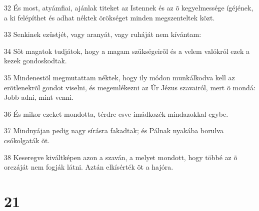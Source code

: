 \par 32 És most, atyámfiai, ajánlak titeket az Istennek és az õ kegyelmessége ígéjének, a ki felépíthet és adhat néktek örökséget minden megszenteltek közt.
\par 33 Senkinek ezüstjét, vagy aranyát, vagy ruháját nem kívántam:
\par 34 Sõt magatok tudjátok, hogy a magam szükségeirõl és a velem valókról ezek a kezek gondoskodtak.
\par 35 Mindenestõl megmutattam néktek, hogy ily módon munkálkodva kell az erõtlenekrõl gondot viselni, és megemlékezni az Úr Jézus szavairól, mert õ mondá: Jobb adni, mint venni.
\par 36 És mikor ezeket mondotta, térdre esve imádkozék mindazokkal egybe.
\par 37 Mindnyájan pedig nagy sírásra fakadtak; és Pálnak nyakába borulva csókolgaták õt.
\par 38 Keseregve kiváltképen azon a szaván, a melyet mondott, hogy többé az õ orczáját nem fogják látni. Aztán elkísérték õt a hajóra.

\chapter{21}

